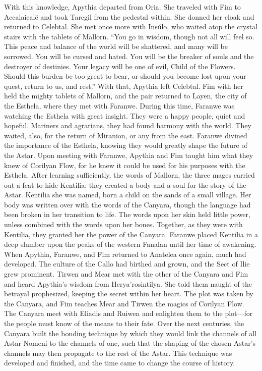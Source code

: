 \documentclass[smalldemyvopaper,11pt,twoside,onecolumn,openright,extrafontsizes]{memoir}
\begin{document}
With this knowledge, Apythia departed from Oria. She traveled with Fim to Accalaicalë and took Taregil from the pedestal within. She donned her cloak and returned to Celebtal. She met once more with Insúlo, who waited atop the crystal stairs with the tablets of Mallorn.
“You go in wisdom, though not all will feel so. This peace and balance of the world will be shattered, and many will be sorrowed. You will be cursed and hated. You will be the breaker of souls and the destroyer of destinies. Your legacy will be one of evil, Child of the Flowers. Should this burden be too great to bear, or should you become lost upon your quest, return to us, and rest.”
With that, Apythia left Celebtal. Fim with her held the mighty tablets of Mallorn, and the pair returned to Layen, the city of the Esthela, where they met with Faranwe.
During this time, Faranwe was watching the Esthela with great insight. They were a happy people, quiet and hopeful. Mariners and agrarians, they had found harmony with the world. They waited, also, for the return of Miranion, or any from the east. Faranwe divined the importance of the Esthela, knowing they would greatly shape the future of the Astar.
Upon meeting with Faranwe, Apythia and Fim taught him what they knew of Corilyan Flow, for he knew it could be used for his purposes with the Esthela. After learning sufficiently, the words of Mallorn, the three mages carried out a feat to hide Kentilia: they created a body and a soul for the story of the Astar. Kentilia she was named, born a child on the sands of a small village. Her body was written over with the words of the Canyara, though the language had been broken in her transition to life. The words upon her skin held little power, unless combined with the words upon her bones. Together, as they were with Kentilia, they granted her the power of the Canyara. Faranwe placed Kentilia in a deep slumber upon the peaks of the western Fanalan until her time of awakening.
When Apythia, Faranwe, and Fim returned to Anatelea once again, much had developed. The culture of the Callo had birthed and grown, and the Sect of Ilie grew prominent. Tirwen and Mear met with the other of the Canyara and Fim and heard Apythia’s wisdom from Herya’rosintilya. She told them naught of the betrayal prophesized, keeping the secret within her heart. The plot was taken by the Canyara, and Fim teaches Mear and Tirwen the magics of Corilyan Flow. The Canyara meet with Eliadis and Ruiwen and enlighten them to the plot—for the people must know of the means to their fate. Over the next centuries, the Canyara built the bonding technique by which they would link the channels of all Astar Nomeni to the channels of one, such that the shaping of the chosen Astar’s channels may then propagate to the rest of the Astar. This technique was developed and finished, and the time came to change the course of history.
\end{document}
